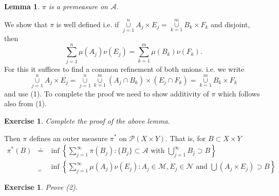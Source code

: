 \documentclass[12pt]{report}
\newtheorem{lemma}[theorem]{Lemma}
\newtheorem {exercise}[theorem] {Exercise}
\newcommand{\twostack}[2]{\mathrel{\mathop{#1}\limits_{#2}}}
\begin{document}
\begin{lemma} $\pi$ is a premeasure on $\mathcal{A}$.
\end{lemma}

  We show that $\pi$ is well defined i.e. if
$\overset{n}{\underset{j=1}{\cup}}  A_j \times E_j =
\overset{m}{\underset{k=1}{\cup}}  B_k \times F_k$ and disjoint, then
 \[
\sum^n_{j=1} \mu(A_j) \nu(E_j) = \sum^m_{k=1} \mu(B_k) \nu(F_k).
\] For this it suffices to find a common refinement of both unions. i.e.  we
write
\[
\overset{n}{\underset{j=1}{\cup}}  A_j \times E_j =
\overset{n}{\underset{j=1}{\cup}} 
\overset{m}{\underset{k=1}{\cup}}  (A_j
\cap B_k) \times (E_j \cap F_k) = \overset{m}{\underset{k=1}{\cup}} 
B_k \times F_k
\] and use (1).  To complete the proof we need to show additivity of $\pi$
which follows also from (1).


\begin{exercise}  Complete the proof of the above lemma.
\end{exercise}

\medskip
\noindent Then $\pi$ defines an outer measure $\pi^*$ on $\mathcal{P}(X
\times Y)$.  That is, for $B \subset X \times Y$
\begin{eqnarray*}
\pi^* (B) &\doteq& \inf \left \{\sum^\infty_{j=1} \pi (B_j): \{B_j\}
\subset \mathcal{A} \mbox{ with } \bigcup^\infty_{j=1} B_j \supset
B\right \}\\ &\twostack{(2)}{=}& \inf \left \{\sum^\infty_{j=1} \mu(A_j)
\nu(E_j): A_j
\in \mathcal{M}, E_j \in \mathcal{N} \mbox{ and } \bigcup (A_j \times E_j)
\supset B\right \}
\end{eqnarray*}

\begin{exercise}  Prove (2).
\end{exercise}
\end{document}
